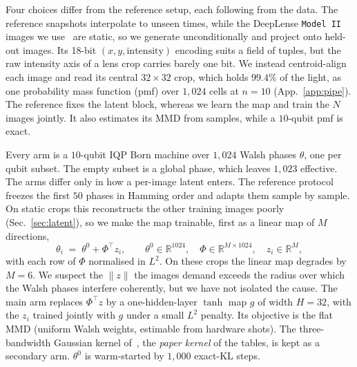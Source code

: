 \documentclass{article}
\begin{document}
Four choices differ from the reference setup, each following from the data. The reference snapshots interpolate to unseen times,
while the DeepLense \texttt{Model~II} images we use~\cite{ml4sci_deeplense} are static, so we
generate unconditionally and project onto held-out images. Its 18-bit $(x,y,\mathrm{intensity})$
encoding suits a field of tuples, but the raw intensity axis of a lens crop carries barely one bit.
We instead centroid-align each image and read its central $32\times32$ crop, which holds $99.4\%$
of the light, as one probability mass function (pmf) over $1{,}024$ cells at $n=10$
(App.~\ref{app:pipe}). The reference fixes the latent block, whereas we learn the map and train the
$N$ images jointly. It also estimates its MMD from samples, while a $10$-qubit pmf is exact.

Every arm is a $10$-qubit IQP Born machine over $1{,}024$ Walsh phases $\theta$, one per qubit
subset. The empty subset is a global phase, which leaves $1{,}023$ effective. The arms differ only
in how a per-image latent enters. The reference protocol freezes the first $50$ phases in Hamming
order and adapts them sample by sample. On static crops this reconstructs the other training images
poorly (Sec.~\ref{sec:latent}), so we make the map trainable, first as a linear map of $M$
directions,
\begin{equation}
\theta_i \;=\; \theta^{0} + \Phi^{\!\top} z_i,
\qquad \theta^{0}\in\mathbb{R}^{1024},\quad
\Phi\in\mathbb{R}^{M\times 1024},\quad z_i \in \mathbb{R}^{M},
\label{eq:affine}
\end{equation}
with each row of $\Phi$ normalised in $L^2$. On these crops the linear map degrades by $M{=}6$. We
suspect the $\|z\|$ the images demand exceeds the radius over which the Walsh phases interfere
coherently, but we have not isolated the cause. The main arm replaces $\Phi^{\!\top} z$ by a
one-hidden-layer $\tanh$ map $g$ of width $H{=}32$, with the $z_i$ trained jointly with $g$ under a
small $L^2$ penalty. Its objective is the flat MMD (uniform Walsh weights, estimable from hardware
shots). The three-bandwidth Gaussian kernel of~\cite{recio_2025_train}, the \emph{paper kernel} of
the tables, is kept as a secondary arm. $\theta^{0}$ is warm-started by $1{,}000$ exact-KL steps.
\end{document}
